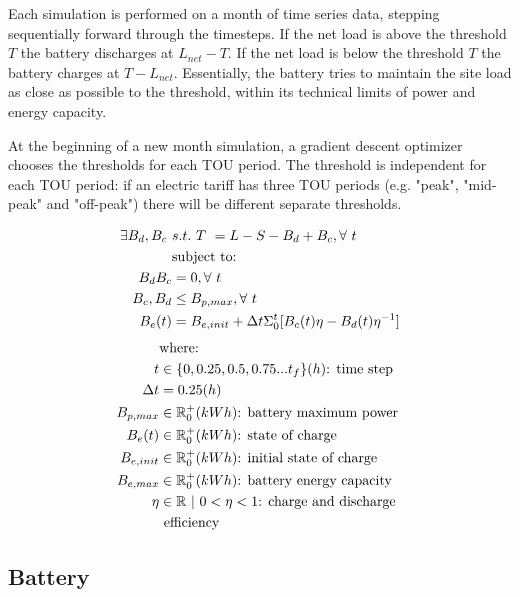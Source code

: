 \documentclass[conference]{IEEEtran}
\begin{document}
Each simulation is performed on a month of time series data, stepping sequentially forward through the timesteps. If the net load is above the threshold $T$ the battery discharges at $L_{net}-T$. If the net load is below the threshold $T$ the battery charges at $T - L_{net}$. Essentially, the battery tries to maintain the site load as close as possible to the threshold, within its technical limits of power and energy capacity. 

At the beginning of a new month simulation, a gradient descent optimizer chooses the thresholds for each TOU period. The threshold is independent for each TOU period: if an electric tariff has three TOU periods (e.g. "peak", "mid-peak" and "off-peak") there will be different separate thresholds. 

\begin{align}
    \exists B_d, B_c\ & s.t.\ T\ = L-S-B_d+B_c, \forall\ t \label{eq:peak-shaving} \\
    & \text{subject to: } \notag \\
    B_d B_c  &= 0,\forall\ t  \\
    B_c, B_d  & \le B_{p,max},\forall\ t \\
    B_e(t)  & = B_{e,init} + \Delta t \Sigma_0^t{ [ B_c(t) \eta - B_d(t) \eta^{-1} ]} \label{eq:soc}
\end{align}
\begin{align*}
    \notag
    & \text{where:} \\
    t & \in \{0, 0.25, 0.5, 0.75 ... t_{f}\} (h) \text{: time step}\\
    \Delta t & = 0.25 (h) \\
    B_{p,max} & \in \mathbb{R}_0^+ (kWh) \text{: battery maximum power } \\
    B_e(t) & \in \mathbb{R}_0^+ (kWh) \text{: state of charge } \\
    B_{e,init} & \in \mathbb{R}_0^+ (kWh) \text{: initial state of charge } \\
    B_{e,max} & \in \mathbb{R}_0^+ (kWh) \text{: battery energy capacity} \\
    \eta   & \in \mathbb{R}\ |\ 0<\eta<1 \text{: charge and discharge} \\
    & \text{ efficiency} \\    
\end{align*}

\subsection{Battery}
\end{document}
